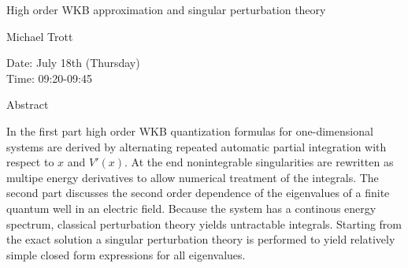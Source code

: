 \begin{center}
\LARGE
High order WKB approximation and singular perturbation
                             theory
\end{center}

\begin{center}
\Large
Michael Trott

\end{center}

\noindent
Date:  July 18th (Thursday)\\
Time:  09:20-09:45\\

\begin{center}
\large
Abstract
\end{center}

In the first part high order WKB quantization formulas for
one-dimensional systems are derived by alternating repeated automatic
partial integration with respect to $x$ and $V'(x)$. At the end
nonintegrable singularities are rewritten as multipe energy
derivatives to allow numerical treatment of the integrals. The second
part discusses the second order dependence of the eigenvalues of a
finite quantum well in an electric field. Because the system has a
continous energy spectrum, classical perturbation theory yields
untractable integrals. Starting from the exact solution a singular
perturbation theory is performed to yield relatively simple closed
form expressions for all eigenvalues.

